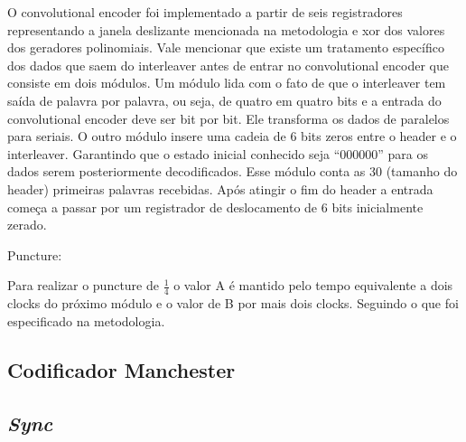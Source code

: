 	O convolutional encoder foi implementado a partir de seis registradores representando a janela deslizante mencionada na metodologia e xor dos valores dos geradores polinomiais.
	Vale mencionar que existe um tratamento específico dos dados que saem do interleaver antes de entrar no convolutional encoder que consiste em dois módulos. Um módulo lida com o fato de que o interleaver tem saída de palavra por palavra, ou seja, de quatro em quatro bits e a entrada do convolutional encoder deve ser bit por bit. Ele transforma os dados de paralelos para seriais.
	O outro módulo insere uma cadeia de 6 bits zeros entre o header e o interleaver. Garantindo que o estado inicial conhecido seja “000000” para os dados serem posteriormente decodificados. Esse módulo conta as 30 (tamanho do header) primeiras palavras recebidas. Após atingir o fim do header a entrada começa a passar por um registrador de deslocamento de 6 bits inicialmente zerado.
	
	
	Puncture:
	
	
	Para realizar o puncture de $\frac{1}{4}$ o valor A é mantido pelo tempo equivalente a dois clocks do próximo módulo e o valor de B por mais dois clocks. Seguindo o que foi especificado na metodologia.
	
	
	
	\subsection{Codificador Manchester}
	
	\subsection{\textit{Sync}}
	
